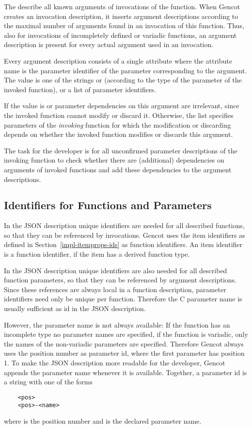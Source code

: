 The  describe all known arguments of invocations of the function. When Gencot creates an
invocation description, it inserts argument descriptions according to the maximal number of arguments found in an 
invocation of this function. Thus, also for invocations of incompletely defined or variadic functions, an argument
description is present for every actual argument used in an invocation.

Every argument description consists of a single attribute where the attribute name is the parameter identifier of the 
parameter corresponding to the argument. The value is one of the strings  or 
(according to the type of the parameter of the invoked function), or a list of parameter identifiers.

If the value is  or  parameter dependencies on this argument are irrelevant, since
the invoked function cannot modify or discard it. Otherwise, the list specifies parameters of the \textit{invoking}
function for which the modification or discarding depends on whether the invoked function modifies or discards this
argument.

The task for the developer is for all unconfirmed parameter descriptions of the invoking function to check whether
there are (additional) dependencies on arguments of invoked functions and add these dependencies to the argument 
descriptions.

\subsection{Identifiers for Functions and Parameters}
\label{impl-parmod-ids}

In the JSON description unique identifiers are needed for all described functions, so that they can be referenced by
invocations. Gencot uses the item identifiers as defined in Section~\ref{impl-itemprops-ids} as function identifiers.
An item identifier is a function identifier, if the item has a derived function type.

In the JSON description unique identifiers are also needed for all described function parameters, so that they can 
be referenced by argument descriptions. Since these references are always local in a function description, parameter
identifiers need only be unique per function. Therefore the C parameter name is usually sufficient as id in the 
JSON description.

However, the parameter name is not always available: If the function has an incomplete type no parameter names are
specified, if the function is variadic, only the names of the non-variadic parameters are specified. Therefore
Gencot always uses the position number as parameter id, where the first parameter has position 1. To make the JSON
description more readable for the developer, Gencot appends the parameter name whenever it is available. Together,
a parameter id is a string with one of the forms
\begin{verbatim}
    <pos>
    <pos>-<name>
\end{verbatim}
where  is the position number and  is the declared parameter name.

